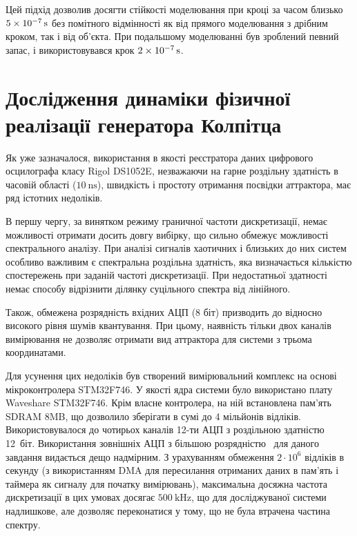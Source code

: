 Цей підхід дозволив досягти стійкості моделювання при кроці
за часом близько
$\SI{5E-7}{\second} $ без помітного відмінності як від прямого
моделювання з дрібним кроком, так і від об'єкта. При подальшому
моделюванні був зроблений певний запас, і використовувався крок
$\SI{2E-7}{\second} $.




\section{Дослідження динаміки фізичної реалізації генератора Колпітца} %

Як уже зазначалося, використання в якості реєстратора даних
цифрового осцилографа класу Rigol DS1052E, незважаючи на гарне роздільну здатність
в часовій області ($ \SI{10}{\nano \second} $), швидкість і простоту отримання посвідки
аттрактора, має ряд істотних недоліків.

В першу чергу, за винятком режиму граничної частоти
дискретизації, немає можливості отримати досить довгу вибірку,
що сильно обмежує можливості спектрального аналізу. При аналізі
сигналів хаотичних і близьких до них систем особливо важливим
є спектральна роздільна здатність, яка визначається кількістю спостережень
при заданій частоті дискретизації. При недостатньої здатності
немає способу відрізнити ділянку суцільного спектра від
лінійного.

Також, обмежена розрядність вхідних АЦП (8 біт) призводить до
відносно високого рівня шумів квантування. При цьому, наявність
тільки двох каналів вимірювання не дозволяє отримати вид
аттрактора для системи з трьома координатами.

Для усунення цих недоліків був створений вимірювальний
комплекс на основі мікроконтролера STM32F746. У якості ядра системи було використано
плату Waveshare STM32F746. Крім власне контролера, на ній
встановлена пам'ять SDRAM 8MB, що дозволило зберігати
в сумі до 4 мільйонів відліків. Використовувалося до чотирьох
каналів 12-ти АЦП з роздільною здатністю 12~біт. Використання
зовнішніх АЦП з більшою розрядністю~\cite{atu_st104a} для даного
завдання видається дещо надмірним. З урахуванням обмеження
$2 \cdot 10 ^ 6 $ відліків в секунду (з використанням DMA для пересилання
отриманих даних в пам'ять і таймера як сигналу для початку
вимірювань), максимальна досяжна частота дискретизації в цих
умовах досягає
$\SI{500}{\kilo \hertz} $, що для досліджуваної системи надлишкове,
але дозволяє переконатися у тому, що не була втрачена частина
спектру.

